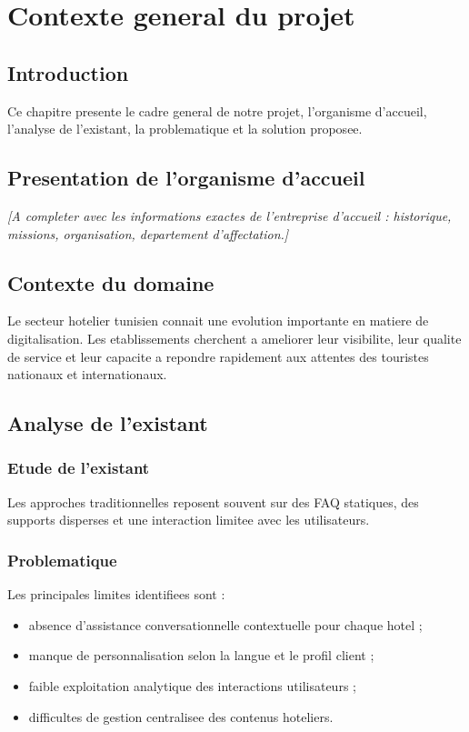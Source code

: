 \chapter{Contexte general du projet}

\section{Introduction}
Ce chapitre presente le cadre general de notre projet, l'organisme d'accueil, l'analyse de l'existant, la problematique et la solution proposee.

\section{Presentation de l'organisme d'accueil}
\textit{[A completer avec les informations exactes de l'entreprise d'accueil : historique, missions, organisation, departement d'affectation.]}

\section{Contexte du domaine}
Le secteur hotelier tunisien connait une evolution importante en matiere de digitalisation. Les etablissements cherchent a ameliorer leur visibilite, leur qualite de service et leur capacite a repondre rapidement aux attentes des touristes nationaux et internationaux.

\section{Analyse de l'existant}
\subsection{Etude de l'existant}
Les approches traditionnelles reposent souvent sur des FAQ statiques, des supports disperses et une interaction limitee avec les utilisateurs.

\subsection{Problematique}
Les principales limites identifiees sont :
\begin{itemize}
  \item absence d'assistance conversationnelle contextuelle pour chaque hotel ;
  \item manque de personnalisation selon la langue et le profil client ;
  \item faible exploitation analytique des interactions utilisateurs ;
  \item difficultes de gestion centralisee des contenus hoteliers.
\end{itemize}

